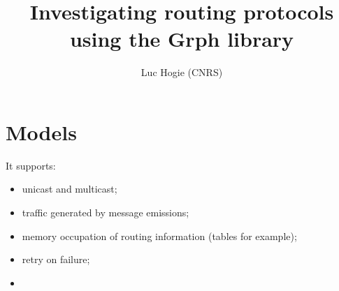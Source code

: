 \documentclass{article}
\title{Investigating routing protocols using the Grph library}
\author{Luc Hogie (CNRS)}
\begin{document}
\maketitle
\vfill

\begin{abstract}

\end{abstract}

\vfill

\begin{footnotesize}
\tableofcontents
\end{footnotesize}


\newpage

\section{Models}

It supports:
\begin{itemize}
  \item unicast and multicast;
  \item traffic generated by message emissions;
  \item memory occupation of routing information (tables for example);
  \item retry on failure;
  \item  
\end{itemize}
\end{document}
